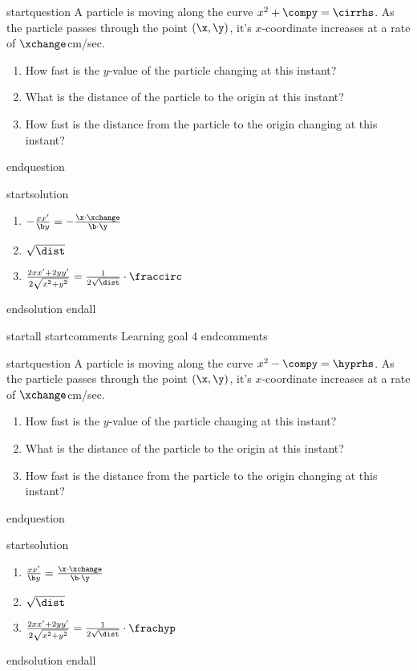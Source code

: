 startquestion A particle is moving along the curve $x^2 + \compy = \cirrhs$. As the particle passes through the point $(\x,\y)$, it's $x$-coordinate increases at a rate of $\xchange$cm/sec. \begin{enumerate}
\item How fast is the $y$-value of the particle changing at this instant? \vfill
\item What is the distance of the particle to the origin at this instant? \vfill
\item How fast is the distance from the particle to the origin changing at this instant? \vfill
\end{enumerate}
endquestion

startsolution
\item \begin{enumerate}
\item $-\frac{xx'}{\b y} = -\frac{\x \cdot \xchange}{\b \cdot \y}$
\item $\sqrt{\dist}$
\item $\frac{2xx'+2yy'}{2\sqrt{x^2+y^2}} = \frac{1}{2\sqrt{\dist}} \cdot \fraccirc$
\end{enumerate}
endsolution
endall


startall
startcomments 
Learning goal 4
endcomments

startquestion A particle is moving along the curve $x^2 - \compy = \hyprhs$. As the particle passes through the point $(\x,\y)$, it's $x$-coordinate increases at a rate of $\xchange$cm/sec. \begin{enumerate}
\item How fast is the $y$-value of the particle changing at this instant? \vfill
\item What is the distance of the particle to the origin at this instant? \vfill
\item How fast is the distance from the particle to the origin changing at this instant? \vfill
\end{enumerate}
endquestion

startsolution
\item \begin{enumerate}
\item $\frac{xx'}{\b y} = \frac{\x \cdot \xchange}{\b \cdot \y}$
\item $\sqrt{\dist}$
\item $\frac{2xx'+2yy'}{2\sqrt{x^2+y^2}} = \frac{1}{2\sqrt{\dist}} \cdot \frachyp$
\end{enumerate}
endsolution
endall


